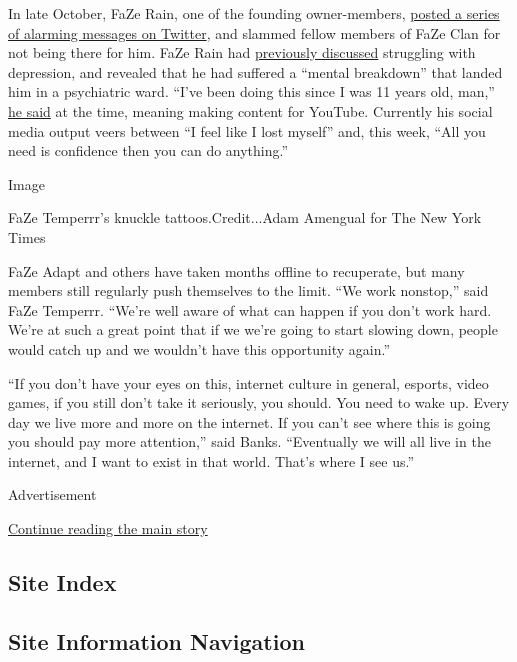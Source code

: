 In late October, FaZe Rain, one of the founding owner-members,
\href{https://twitter.com/joshpescatore/status/1188143277993795584?s=21}{posted
a series of alarming messages on Twitter}, and slammed fellow members of
FaZe Clan for not being there for him. FaZe Rain had
\href{https://www.dexerto.com/entertainment/faze-rain-speaks-out-about-his-intense-struggle-with-depression-and-why-he-took-a-break-from-youtube-125419}{previously
discussed} struggling with depression, and revealed that he had suffered
a ``mental breakdown'' that landed him in a psychiatric ward. ``I've
been doing this since I was 11 years old, man,''
\href{https://www.dexerto.com/entertainment/faze-rain-speaks-out-about-his-intense-struggle-with-depression-and-why-he-took-a-break-from-youtube-125419}{he
said} at the time, meaning making content for YouTube. Currently his
social media output veers between ``I feel like I lost myself'' and,
this week, ``All you need is confidence then you can do anything.''

Image

FaZe Temperrr's knuckle tattoos.Credit...Adam Amengual for The New York
Times

FaZe Adapt and others have taken months offline to recuperate, but many
members still regularly push themselves to the limit. ``We work
nonstop,'' said FaZe Temperrr. ``We're well aware of what can happen if
you don't work hard. We're at such a great point that if we we're going
to start slowing down, people would catch up and we wouldn't have this
opportunity again.''

``If you don't have your eyes on this, internet culture in general,
esports, video games, if you still don't take it seriously, you should.
You need to wake up. Every day we live more and more on the internet. If
you can't see where this is going you should pay more attention,'' said
Banks. ``Eventually we will all live in the internet, and I want to
exist in that world. That's where I see us.''

Advertisement

\protect\hyperlink{after-bottom}{Continue reading the main story}

\hypertarget{site-index}{%
\subsection{Site Index}\label{site-index}}

\hypertarget{site-information-navigation}{%
\subsection{Site Information
Navigation}\label{site-information-navigation}}

